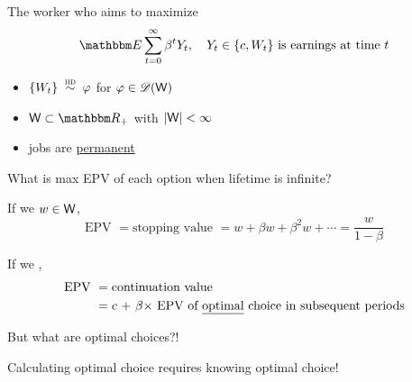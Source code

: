 \begin{frame}
    
    The worker who aims to maximize 
    \begin{equation}
        \EE \sum_{t=0}^{\infty} \beta^t Y_t,
        \quad 
        \text{$Y_t \in \{c, W_t\}$ is earnings at time $t$}
    \end{equation}

        \vspace{0.4em}
    \begin{itemize}
        \item $\{ W_t \} \stackrel{\textrm{ {\sc iid }}} {\sim} \varphi$ for $\varphi \in \mathscr D(\mathsf W)$ 
        \vspace{0.4em}
        \item $\Wsf \subset \RR_+$ with $|\mathsf W| < \infty$
        \vspace{0.4em}
        \item jobs are \underline{permanent} 
    \end{itemize}


\end{frame}


\begin{frame}
    
    What is max EPV of each option when lifetime is infinite?  

        \vspace{0.4em}
    If we  $w \in \mathsf W$,
    \begin{equation*}
        \text{EPV }
        = \text{stopping value }
        = w + \beta w + \beta^2 w + \cdots 
        = \frac{w}{1 - \beta}
    \end{equation*}

        \vspace{0.4em}
    If we ,
    \begin{align*}
        \text{EPV }
        & = \text{continuation value }
        \\
        & = \text{$c$ + $\beta \times$ EPV of 
        \underline{optimal} choice in subsequent periods}
    \end{align*}

        \vspace{0.4em}
    But what are optimal choices?!
        \vspace{0.4em}

    Calculating optimal choice requires knowing optimal choice!

\end{frame}

